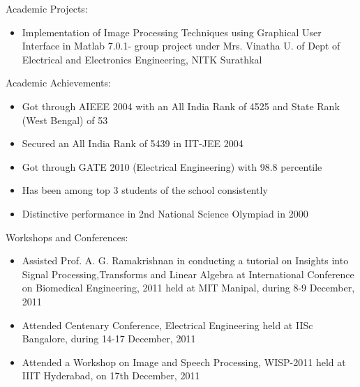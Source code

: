 \documentclass[10pt]{article}
\begin{document}
\begin{cv}
\begin{cvlist}{Academic Projects:}
\begin{itemize}
\item
Implementation of Image Processing Techniques using Graphical User
Interface in Matlab 7.0.1- group project under Mrs. Vinatha U. of Dept of Electrical
and Electronics Engineering, NITK Surathkal





\end{itemize}
\end{cvlist}

\begin{cvlist}{Academic Achievements:}
\item
\begin{itemize}\itemsep=0.25em
	\item
Got through AIEEE 2004 with an All India Rank of 4525 and State Rank (West Bengal) of 53

\item

 Secured an All India Rank of 5439 in IIT-JEE 2004

\item
Got through GATE 2010 (Electrical Engineering) with 98.8 percentile

\item
Has been among top 3 students of the school consistently

\item
Distinctive performance in 2nd National Science Olympiad in 2000


	\end{itemize}

\end{cvlist}




\begin{cvlist}{Workshops and Conferences:}
\item
\begin{itemize}\itemsep=0.25em
 \item Assisted Prof. A. G. Ramakrishnan in conducting a tutorial on Insights into Signal Processing,Transforms and Linear Algebra at International Conference on Biomedical Engineering, 2011 held at MIT Manipal, during 8-9 December, 2011
\item Attended  Centenary Conference, Electrical Engineering held at IISc Bangalore, during 14-17 December, 2011
\item Attended a Workshop on Image and Speech Processing, WISP-2011 held at IIIT Hyderabad,  on 17th December, 2011


\end{itemize}
\end{cvlist}
\end{cv}
\end{document}
